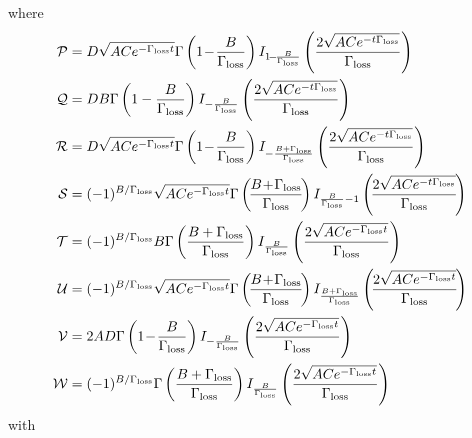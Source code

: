 \documentclass[]{report}
\begin{document}
where 
\begin{align}
\mathcal{P} &= D\sqrt{ACe^{-\Gamma_{\rm loss}  t}} \Gamma \left(1\!-\!\frac{B}{\Gamma_{\rm loss} }\right) I_{1\!-\!\frac{B}{\Gamma_{\rm loss} }}\left(\frac{2 \sqrt{ACe^{-t \Gamma_{\rm loss} }}}{\Gamma_{\rm loss} }\right)\\
\mathcal{Q} &= D B \Gamma \left(1-\frac{B}{\Gamma_{\rm loss} }\right) I_{-\frac{B}{\Gamma_{\rm loss} }}\left(\frac{2 \sqrt{AC e^{-t \Gamma_{\rm loss} }}}{\Gamma_{\rm loss} }\right)\\
\mathcal{R} &= D \sqrt{ACe^{-\Gamma_{\rm loss} t}} \Gamma \left(1\!-\!\frac{B}{\Gamma_{\rm loss} }\right) I_{-\frac{B+\Gamma_{\rm loss} }{\Gamma_{\rm loss} }}\left(\frac{2 \sqrt{AC e^{-t \Gamma_{\rm loss} }}}{\Gamma_{\rm loss} }\right)\\
\mathcal{S} &= (-1)^{B/\Gamma_{\rm loss} } \sqrt{AC e^{-\Gamma_{\rm loss} t}} \Gamma \left(\!\frac{B\!+\!\Gamma_{\rm loss} }{\Gamma_{\rm loss} }\!\right) I_{\frac{B}{\Gamma_{\rm loss} }-1}\left(\!\frac{2 \sqrt{AC e^{-t \Gamma_{\rm loss} }}}{\Gamma_{\rm loss} }\!\right)\\
\mathcal{T} &= (-1)^{B/\Gamma_{\rm loss} }B \Gamma \left(\frac{B+\Gamma_{\rm loss} }{\Gamma_{\rm loss} }\right) I_{\frac{B}{\Gamma_{\rm loss} }}\left(\frac{2 \sqrt{AC e^{-\Gamma_{\rm loss} t}}}{\Gamma_{\rm loss} }\right)\\
\mathcal{U} &= (-1)^{B/\Gamma_{\rm loss} } \sqrt{AC e^{-\Gamma_{\rm loss}  t}} \Gamma \left(\!\frac{B\!+\!\Gamma_{\rm loss} }{\Gamma_{\rm loss} }\!\right) I_{\frac{B+\Gamma_{\rm loss} }{\Gamma_{\rm loss} }}\left(\!\frac{2 \sqrt{AC e^{- \Gamma_{\rm loss}t }}}{\Gamma_{\rm loss} }\!\right)\\
\mathcal{V} &= 2 A D \Gamma \left(1\!-\!\frac{B}{\Gamma_{\rm loss} }\right) I_{-\frac{B}{\Gamma_{\rm loss} }}\left(\frac{2 \sqrt{AC e^{-\Gamma_{\rm loss}t }}}{\Gamma_{\rm loss} }\right)\\
\mathcal{W} &= (-1)^{B/\Gamma_{\rm loss} } \Gamma \left(\frac{B+\Gamma_{\rm loss} }{\Gamma_{\rm loss} }\right) I_{\frac{B}{\Gamma_{\rm loss} }}\left(\frac{2 \sqrt{AC e^{-\Gamma_{\rm loss}t }}}{\Gamma_{\rm loss} }\right)
\end{align}
with 
\end{document}
